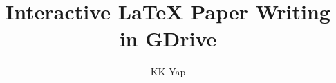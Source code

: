 ﻿\documentclass{article}
\begin{document}
\title{Interactive LaTeX Paper Writing in GDrive}
\author{KK Yap}
\maketitle
\end{document}
